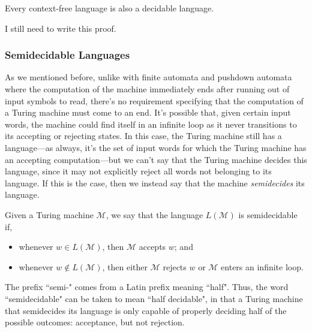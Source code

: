 \begin{theorem}\label{thm:contextfreeisdecidable}
Every context-free language is also a decidable language.

\begin{construction}
I still need to write this proof.
\end{construction}
\end{theorem}

\subsubsection*{Semidecidable Languages}

As we mentioned before, unlike with finite automata and pushdown automata where the computation of the machine immediately ends after running out of input symbols to read, there's no requirement specifying that the computation of a Turing machine must come to an end. It's possible that, given certain input words, the machine could find itself in an infinite loop as it never transitions to its accepting or rejecting states. In this case, the Turing machine still has a language---as always, it's the set of input words for which the Turing machine has an accepting computation---but we can't say that the Turing machine decides this language, since it may not explicitly reject all words not belonging to its language. If this is the case, then we instead say that the machine \emph{semidecides} its language.

\begin{definition}\label{def:semidecidablelanguage}
Given a Turing machine $\mathcal{M}$, we say that the language $L(\mathcal{M})$ is semidecidable if,
\begin{itemize}
\item whenever $w \in L(\mathcal{M})$, then $\mathcal{M}$ accepts $w$; and
\item whenever $w \not\in L(\mathcal{M})$, then either $\mathcal{M}$ rejects $w$ or $\mathcal{M}$ enters an infinite loop.
\end{itemize}
\end{definition}

\begin{remark}
The prefix ``semi-" comes from a Latin prefix meaning ``half". Thus, the word ``semidecidable" can be taken to mean ``half decidable", in that a Turing machine that semidecides its language is only capable of properly deciding half of the possible outcomes: acceptance, but not rejection.
\end{remark}

